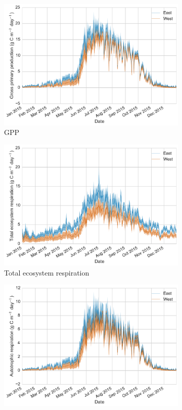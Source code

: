 \documentclass[11pt]{article}
\begin{document}
\begin{figure}[ht]
    \centering
    \begin{subfigure}[b]{0.49\textwidth}
        \includegraphics[width=\textwidth]{gpp.pdf}
        \caption{GPP}
        \label{fig:gpp}
        \end{subfigure}
     \begin{subfigure}[b]{0.49\textwidth}
        \includegraphics[width=\textwidth]{rt.pdf}
        \caption{Total ecosystem respiration}
        \label{fig:rt}
    \end{subfigure}
    \begin{subfigure}[b]{0.49\textwidth}
        \includegraphics[width=\textwidth]{ra.pdf}

\end{subfigure}
\end{figure}
\end{document}
